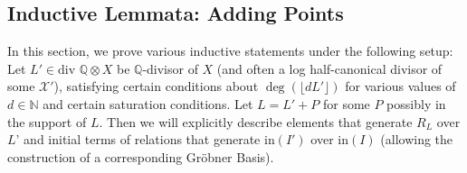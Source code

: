 \documentclass{amsart}
\theoremstyle{plain}
\theoremstyle{definition}
\theoremstyle{remark}
\newtheorem{rem}[thm]{Remark}
\numberwithin{equation}{section}
\newcommand\ssec{\subsection}
\newcommand\BQ{{\mathbb Q}}
\newcommand \sx{\mathscr X}
\newcommand \di{\text{div }}
\newcommand \halfcan{L}
\newcommand \initial{\text{in}}
\begin{document}
%
%
%
%





\ssec{Inductive Lemmata: Adding Points}
\label{ssec:add-points}
In this section, we prove various inductive statements under the following setup:
Let $\halfcan' \in \di \BQ \otimes X$ be $\BQ$-divisor of $X$ (and often a log half-canonical divisor of some $\sx'$), satisfying certain conditions about $\deg(\lfloor d \halfcan'\rfloor)$ for various values of $d\in\mathbb{N}$ and certain saturation conditions. Let $\halfcan=\halfcan'+P$ for some $P$ possibly in the support of $\halfcan$.  Then we will explicitly describe elements that generate $R_\halfcan$ over $\halfcan$' and initial terms of relations that generate $\initial(I')$ over $\initial(I)$ (allowing the construction of a corresponding Gr\"{o}bner Basis). 
\end{document}
